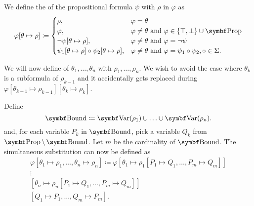 \begin{definition}\label{def:propositional_substition}
  \begin{DefEnum}
     We define the  of the propositional formula \( \psi \) with \( \rho \) in \( \varphi \) as
    \begin{equation}\label{eq:def:propositional_substition/single}
      \varphi[\theta \mapsto \rho] \coloneqq \begin{cases}
        \rho,                                                          &\varphi = \theta \\
        \varphi,                                                       &\varphi \neq \theta \Tand \varphi \in \{ \top, \bot \} \cup \Bold{Prop} \\
        \neg \psi[\theta \mapsto \rho],                                &\varphi \neq \theta \Tand \varphi = \neg \psi \\
        \psi_1[\theta \mapsto \rho] \circ \psi_2[\theta \mapsto \rho], &\varphi \neq \theta \Tand \varphi = \psi_1 \circ \psi_2, \circ \in \Sigma.
      \end{cases}
    \end{equation}

     We will now define  of \( \theta_1, \ldots, \theta_n \) with \( \rho_1, \ldots, \rho_n \). We wish to avoid the case where \( \theta_k \) is a subformula of \( \rho_{k-1} \) and it accidentally gets replaced during \( \varphi[\theta_{k-1} \mapsto \rho_{k-1}][\theta_k \mapsto \rho_k] \).

    Define
    \begin{equation*}
      \Cat{Bound} \coloneqq \Bold{Var}(\rho_1) \cup \ldots \cup \Bold{Var}(\rho_n).
    \end{equation*}
    and, for each variable \( P_k \) in \( \Cat{Bound} \), pick a variable \( Q_k \) from \( \Bold{Prop} \setminus \Bold{Bound} \). Let \( m \) be the \hyperref[def:cardinal]{cardinality} of \( \Bold{Bound} \). The simultaneous substitution can now be defined as
    \begin{align*}
      \varphi[\theta_1 \mapsto \rho_1, \ldots, \theta_n \mapsto \rho_n] \coloneqq \varphi
      [\theta_1 \mapsto \rho_1[P_1 \mapsto Q_1, \ldots, P_m \mapsto Q_m]] \\
      \vdots \hspace{3cm} \\
      [\theta_n \mapsto \rho_n[P_1 \mapsto Q_1, \ldots, P_m \mapsto Q_m]] \\
      [Q_1 \mapsto P_1, \ldots, Q_m \mapsto P_m].
    \end{align*}
  \end{DefEnum}
\end{definition}

